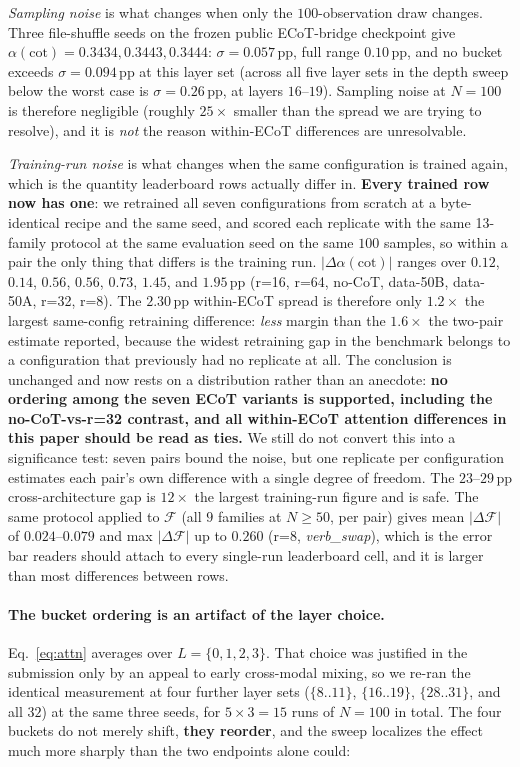 \documentclass{article}
\begin{document}
\emph{Sampling noise} is what changes when only the $100$-observation draw changes. Three file-shuffle seeds on the frozen public ECoT-bridge checkpoint give $\alpha(\text{cot}) = 0.3434, 0.3443, 0.3444$: $\sigma = 0.057$\,pp, full range $0.10$\,pp, and no bucket exceeds $\sigma = 0.094$\,pp at this layer set (across all five layer sets in the depth sweep below the worst case is $\sigma = 0.26$\,pp, at layers $16$--$19$). Sampling noise at $N{=}100$ is therefore negligible (roughly $25\times$ smaller than the spread we are trying to resolve), and it is \emph{not} the reason within-ECoT differences are unresolvable.

\emph{Training-run noise} is what changes when the same configuration is trained again, which is the quantity leaderboard rows actually differ in. \textbf{Every trained row now has one}: we retrained all seven configurations from scratch at a byte-identical recipe and the same seed, and scored each replicate with the same 13-family protocol at the same evaluation seed on the same $100$ samples, so within a pair the only thing that differs is the training run. $|\Delta\alpha(\text{cot})|$ ranges over $0.12$, $0.14$, $0.56$, $0.56$, $0.73$, $1.45$, and $\mathbf{1.95}$\,pp (r=16, r=64, no-CoT, data-50B, data-50A, r=32, r=8). The $2.30$\,pp within-ECoT spread is therefore only $\mathbf{1.2\times}$ the largest same-config retraining difference: \emph{less} margin than the $1.6\times$ the two-pair estimate reported, because the widest retraining gap in the benchmark belongs to a configuration that previously had no replicate at all. The conclusion is unchanged and now rests on a distribution rather than an anecdote: \textbf{no ordering among the seven ECoT variants is supported, including the no-CoT-vs-r=32 contrast, and all within-ECoT attention differences in this paper should be read as ties.} We still do not convert this into a significance test: seven pairs bound the noise, but one replicate per configuration estimates each pair's own difference with a single degree of freedom. The $23$--$29$\,pp cross-architecture gap is $12\times$ the largest training-run figure and is safe. The same protocol applied to $\mathcal{F}$ (all $9$ families at $N \geq 50$, per pair) gives mean $|\Delta\mathcal{F}|$ of $0.024$--$0.079$ and max $|\Delta\mathcal{F}|$ up to $\mathbf{0.260}$ (r=8, \emph{verb\_swap}), which is the error bar readers should attach to every single-run leaderboard cell, and it is larger than most differences between rows.

\paragraph{The bucket ordering is an artifact of the layer choice.} Eq.~\ref{eq:attn} averages over $L = \{0,1,2,3\}$. That choice was justified in the submission only by an appeal to early cross-modal mixing, so we re-ran the identical measurement at four further layer sets ($\{8..11\}$, $\{16..19\}$, $\{28..31\}$, and all $32$) at the same three seeds, for $5 \times 3 = 15$ runs of $N{=}100$ in total. The four buckets do not merely shift, \textbf{they reorder}, and the sweep localizes the effect much more sharply than the two endpoints alone could:
\end{document}

